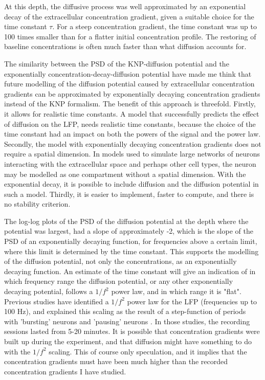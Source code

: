 \documentclass{uiophd}
\begin{document}
At this depth, the diffusive process was well approximated by an exponential decay of the extracellular concentration gradient, given a suitable choice for the time constant $\tau$. For a steep concentration gradient, the time constant was up to 100 times smaller than for a flatter initial concentration profile. The restoring of baseline concentrations is often much faster than what diffusion accounts for. 


The similarity between the PSD of the KNP-diffusion potential and the exponentially concentration-decay-diffusion potential have made me think that future modelling of the diffusion potential caused by extracellular concentration gradients can be approximated by exponentially decaying concentration gradients instead of the KNP formalism. The benefit of this approach is threefold. Firstly, it allows for realistic time constants. A model that successfully predicts the effect of diffusion on the LFP, needs realistic time constants, because the choice of the time constant had an impact on both the powers of the signal and the power law. Secondly, the model with exponentially decaying concentration gradients does not require a spatial dimension. In models used to simulate large networks of neurons interacting with the extracellular space and perhaps other cell types, the neuron may be modelled as one compartment without a spatial dimension. With the exponential decay, it is possible to include diffusion and the diffusion potential in such a model. Thirdly, it is easier to implement, faster to compute, and there is no stability criterion.


The log-log plots of the PSD of the diffusion potential at the depth where the potential was largest, had a slope of approximately -2, which is the slope of the PSD of an exponentially decaying function, for frequencies above a certain limit, where this limit is determined by the time constant. This supports the modelling of the diffusion potential, not only the concentrations, as an exponentially decaying function. 
An estimate of the time constant will give an indication of in which frequency range the diffusion potential, or any other exponentially decaying potential, follows a $1/f^2$ power law, and in which range it is "flat". Previous studies have identified a  $1/f^2$ power law for the LFP (frequencies up to 100 Hz), and explained this scaling as the result of a step-function of periods with 'bursting' neurons and 'pausing' neurons \cite{Baranauskas2011}. In those studies, the recording sessions lasted from 5-20 minutes. It is possible that concentration gradients were built up during the experiment, and that diffusion might have something to do with the $1/f^2$ scaling. This of course only speculation, and it implies that the concentration gradients must have been much higher than the recorded concentration gradients I have studied. 
\end{document}

